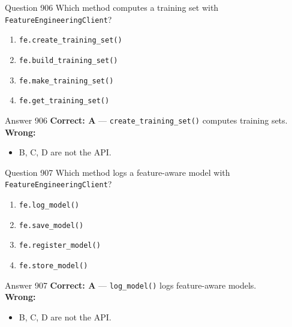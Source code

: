 \documentclass[aspectratio=169,11pt]{beamer}
\begin{document}
	\begin{frame}{Question 906}
		Which method computes a training set with \texttt{FeatureEngineeringClient}?
		\begin{enumerate}[label=\Alph*.]
			\item \texttt{fe.create\_training\_set()}
			\item \texttt{fe.build\_training\_set()}
			\item \texttt{fe.make\_training\_set()}
			\item \texttt{fe.get\_training\_set()}
		\end{enumerate}
	\end{frame}
	\begin{frame}{Answer 906}
		\textbf{Correct: A} --- \texttt{create\_training\_set()} computes training sets.\\
		\vspace{0.5em}
		\textbf{Wrong:}
		\begin{itemize}
			\item B, C, D are not the API.
		\end{itemize}
	\end{frame}
	
	\begin{frame}{Question 907}
		Which method logs a feature-aware model with \texttt{FeatureEngineeringClient}?
		\begin{enumerate}[label=\Alph*.]
			\item \texttt{fe.log\_model()}
			\item \texttt{fe.save\_model()}
			\item \texttt{fe.register\_model()}
			\item \texttt{fe.store\_model()}
		\end{enumerate}
	\end{frame}
	\begin{frame}{Answer 907}
		\textbf{Correct: A} --- \texttt{log\_model()} logs feature-aware models.\\
		\vspace{0.5em}
		\textbf{Wrong:}
		\begin{itemize}
			\item B, C, D are not the API.
		\end{itemize}
	\end{frame}
	
\end{document}
